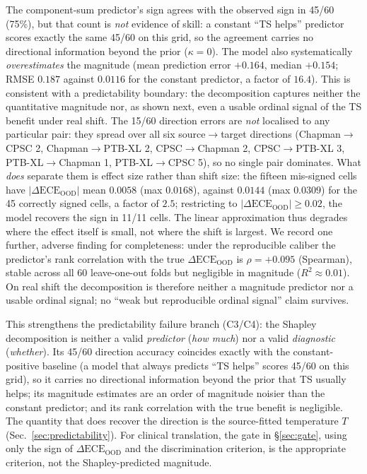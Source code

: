 \documentclass[final,5p,times,nonatbib]{elsarticle}
\begin{document}
The component-sum predictor's sign agrees with the observed sign in
45/60 (75\%), but that count is \emph{not} evidence of skill: a
constant ``TS helps'' predictor scores exactly the same 45/60 on this
grid, so the agreement carries no directional information beyond the
prior ($\kappa = 0$). The model also systematically \emph{overestimates}
the magnitude (mean prediction error $+0.164$, median $+0.154$; RMSE
$0.187$ against $0.0116$ for the constant predictor, a factor of
$16.4$). This is consistent with a predictability boundary: the
decomposition captures neither the quantitative magnitude nor, as
shown next, even a usable ordinal signal of the TS benefit under real
shift. The 15/60 direction errors are \emph{not} localised to any
particular pair: they spread over all six source$\rightarrow$target
directions (Chapman$\rightarrow$CPSC 2, Chapman$\rightarrow$PTB-XL 2,
CPSC$\rightarrow$Chapman 2, CPSC$\rightarrow$PTB-XL 3,
PTB-XL$\rightarrow$Chapman 1, PTB-XL$\rightarrow$CPSC 5), so no single
pair dominates. What \emph{does} separate them is effect size rather than
shift size: the fifteen mis-signed cells have
$|\Delta\text{ECE}_{\text{OOD}}|$ mean $0.0058$ (max $0.0168$), against
$0.0144$ (max $0.0309$) for the 45 correctly signed cells, a factor of
$2.5$; restricting to $|\Delta\text{ECE}_{\text{OOD}}| \geq 0.02$, the
model recovers the sign in 11/11 cells. The linear approximation thus
degrades where the effect itself is small, not where the shift is
largest. We record one further, adverse finding for completeness: under
the reproducible caliber the predictor's rank correlation with the true
$\Delta\text{ECE}_{\text{OOD}}$ is $\rho = +0.095$ (Spearman), stable
across all 60 leave-one-out folds but negligible in magnitude
($R^2 \approx 0.01$). On real shift the decomposition is therefore
neither a magnitude predictor nor a usable ordinal signal; no ``weak but
reproducible ordinal signal'' claim survives.

This strengthens the predictability failure branch (C3/C4): the
Shapley decomposition is neither a valid \emph{predictor} (\emph{how
much}) nor a valid \emph{diagnostic} (\emph{whether}). Its 45/60
direction accuracy coincides exactly with the constant-positive
baseline (a model that always predicts ``TS helps'' scores 45/60 on
this grid), so it carries no directional information beyond the prior
that TS usually helps; its magnitude estimates are an order of
magnitude noisier than the constant predictor; and its rank
correlation with the true benefit is negligible. The quantity
that does recover the direction is the source-fitted temperature $T$
(Sec.~\ref{sec:predictability}). For clinical translation, the gate in
\S\ref{sec:gate}, using only the sign of
$\Delta\text{ECE}_{\text{OOD}}$ and the discrimination criterion, is the
appropriate criterion, not the Shapley-predicted magnitude.
\end{document}
